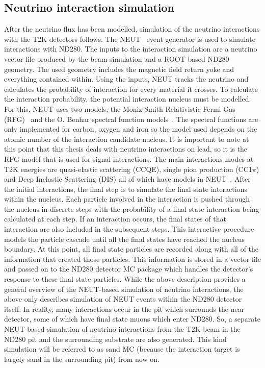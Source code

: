 \subsection{Neutrino interaction simulation}
\label{subsec:NeutrinoInteractionSimulation}
After the neutrino flux has been modelled, simulation of the neutrino interactions with the T2K detectors follows.  The NEUT~\cite{Hayato2002171} event generator is used to simulate interactions with ND280.  The inputs to the interaction simulation are a neutrino vector file produced by the beam simulation and a ROOT based ND280 geometry.  The used geometry includes the magnetic field return yoke and everything contained within.  Using the inputs, NEUT tracks the neutrino and calculates the probability of interaction for every material it crosses.  To calculate the interaction probability, the potential interaction nucleus must be modelled.  For this, NEUT uses two models; the Moniz-Smith Relativistic Fermi Gas (RFG)~\cite{Miller2002223} and the O. Benhar spectral function models~\cite{Benhar1994493}.  The spectral functions are only implemented for carbon, oxygen and iron so the model used depends on the atomic number of the interaction candidate nucleus.  It is important to note at this point that this thesis deals with neutrino interactions on lead, so it is the RFG model that is used for signal interactions.
\newline 
\newline
The main interactions modes at T2K energies are quasi-elastic scattering (CCQE), single pion production  (CC1$\pi$) and Deep Inelastic Scattering (DIS) all of which have models in NEUT~\cite{LlewellynSmith1972261,Rein198179,1126-6708-2006-05-026}.
\newline
\newline
After the initial interactions, the final step is to simulate the final state interactions within the nucleus.  Each particle involved in the interaction is pushed through the nucleus in discrete steps with the probability of a final state interaction being calculated at each step.  If an interaction occurs, the final states of that interaction are also included in the subsequent steps.  This interactive procedure models the particle cascade until all the final states have reached the nucleus boundary.  At this point, all final state particles are recorded along with all of the information that created those particles.  This information is stored in a vector file and passed on to the ND280 detector MC package which handles the detector's response to these final state particles.
\newline
\newline
While the above description provides a general overview of the NEUT-based simulation of neutrino interactions, the above only describes simulation of NEUT events within the ND280 detector itself.  In reality, many interactions occur in the pit which surrounds the near detector, some of which have final state muons which enter ND280.  So, a separate NEUT-based simulation of neutrino interactions from the T2K beam in the ND280 pit and the surrounding substrate are also generated.  This kind simulation will be referred to as sand MC (because the interaction target is largely sand in the surrounding pit) from now on.
